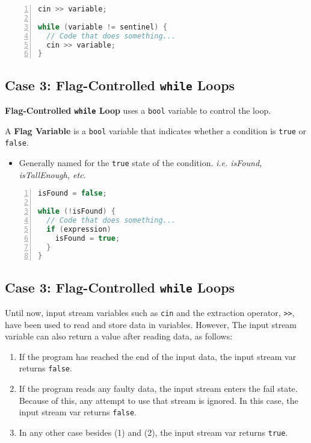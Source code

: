 \documentclass{article}
\begin{document}
\begin{lstlisting}[language=C++, caption={Sentinel-Controlled \texttt{while} Loop
  Syntax}, numbers=left]
cin >> variable;

while (variable != sentinel) {
  // Code that does something...
  cin >> variable;
}
\end{lstlisting}

\subsection{Case 3: Flag-Controlled \texttt{while} Loops}

\textbf{Flag-Controlled \texttt{while} Loop} uses a \texttt{bool} variable to
control the loop.

\vspace{8pt}
A \textbf{Flag Variable} is a \texttt{bool} variable that indicates whether a
condition is \texttt{true} or \texttt{false}.
\begin{itemize}
  \item Generally named for the \texttt{true} state of the condition. \textit{i.e. isFound, isTallEnough, etc}.
\end{itemize}

\begin{lstlisting}[language=C++, caption={Flag-Controlled \texttt{while} Loop
  Example}, numbers=left]
isFound = false;

while (!isFound) {
  // Code that does something...
  if (expression)
    isFound = true;
  }
}
\end{lstlisting}

\subsection{Case 3: Flag-Controlled \texttt{while} Loops}

Until now, input stream variables such as \texttt{cin} and the extraction
operator, \texttt{>>}, have been used to read and store data in variables.
However, The input stream variable can also return a value after reading data,
as follows:
\begin{enumerate}
  \item If the program has reached the end of the input data, the input stream
    var returns \texttt{false}.
  \item If the program reads any faulty data, the input stream enters the fail
    state. Because of this, any attempt to use that stream is ignored. In this
    case, the input stream var returns \texttt{false}.
  \item In any other case besides (1) and (2), the input stream var returns
    \texttt{true}.
\end{enumerate}
\end{document}
